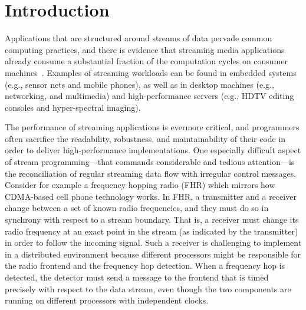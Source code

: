 \section{Introduction}


Applications that are structured around streams of data pervade common
computing  practices,  and  there  is evidence  that  streaming  media
applications already consume a substantial fraction of the computation
cycles    on    consumer   machines~\cite{Rix98}.
Examples  of streaming  workloads  can be  found  in embedded  systems
(e.g., sensor nets and mobile  phones), as well as in desktop machines
(e.g., networking, and  multimedia) and high-performance servers (e.g.,
HDTV editing consoles and hyper-spectral imaging). 

The performance of streaming applications is evermore critical, and
programmers often sacrifice the readability, robustness, and
maintainability of their code in order to deliver high-performance
implementations.  One especially difficult aspect of stream
programming---that commands considerable and tedious attention---is
the reconciliation of regular streaming data flow with irregular
control messages. Consider for example a frequency hopping radio (FHR)
which mirrors how CDMA-based cell phone technology works.  In FHR, a
transmitter and a receiver change between a set of known radio
frequencies, and they must do so in synchrony with respect to a stream
boundary. That is, a receiver must change its radio frequency at an
exact point in the stream (as indicated by the transmitter) in order
to follow the incoming signal.  Such a receiver is challenging to
implement in a distributed environment because different processors
might be responsible for the radio frontend and the frequency hop
detection.  When a frequency hop is detected, the detector must send a
message to the frontend that is timed precisely with respect to the
data stream, even though the two components are running on different
processors with independent clocks.

